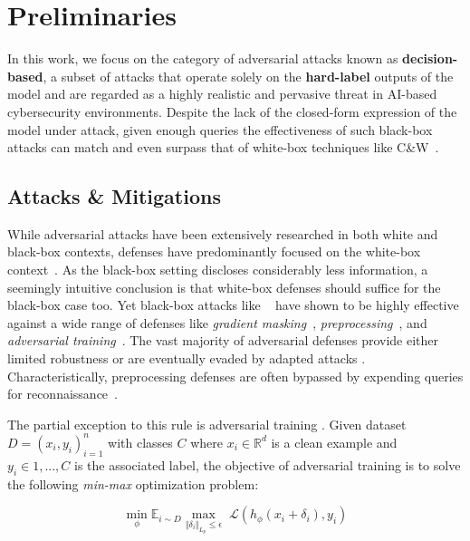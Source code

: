 \section{Preliminaries}
\label{sec:background}
In this work, we focus on the category of adversarial attacks known as \textbf{decision-based}, a subset of  attacks that operate solely on the \textbf{hard-label} outputs of the model and are regarded as a highly realistic and pervasive threat in AI-based cybersecurity environments.
Despite the lack of the closed-form expression of the model under attack, given enough queries the effectiveness of such black-box attacks can match and even surpass that of white-box techniques like C\&W~\cite{carlini2017towards}.

\subsection{Attacks \& Mitigations}
While adversarial attacks have been extensively researched in both white and black-box contexts, defenses have predominantly focused on the white-box context~\cite{madry2017towards, wang2019convergence}.
As the black-box setting discloses considerably less information, a seemingly intuitive conclusion is that white-box defenses should suffice for the black-box case too.
Yet black-box attacks like ~\cite{brendel2018decision, chen2020hopskipjumpattack} have shown to be highly effective against a wide range of defenses like \emph{gradient masking}~\cite{athalye2018obfuscated}, \emph{preprocessing}~\cite{qin2021random, byun2022effectiveness}, and \emph{adversarial training}~\cite{madry2017towards}.
The vast majority of adversarial defenses provide either limited robustness or are eventually evaded by adapted attacks \cite{tramer2020adaptive}.
Characteristically, preprocessing defenses are often bypassed by expending queries for reconnaissance~\cite{sitawarin2022preprocessors}.

The partial exception to this rule is adversarial training \cite{madry2017towards}.
Given dataset $D = {(x_i, y_i)}^{n}_{i=1}$ with classes $C$ where $x_i \in \mathbb{R}^d$ is a clean example and $y_i \in {1,..., C}$ is the associated label, the objective of adversarial training is to solve the following \emph{min-max} optimization problem:

\begin{equation}
    \underset{\phi}{\operatorname{min}} \mathbb{E}_{i\sim D} \underset{\Vert \delta_i \Vert_{L_p} \leq \epsilon}{\operatorname{max}} \; \mathcal{L}(h_{\phi}(x_i + \delta_i), y_i)
\label{eqn:adv_train}
\end{equation}

